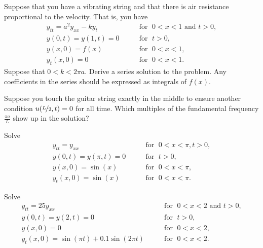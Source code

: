 \begin{exercise}[challenging]
Suppose that you have a vibrating string and that
there is air resistance proportional to the velocity.  That is, you have
\begin{equation*}
\begin{array}{ll}
y_{tt} = a^2 y_{xx} - k y_t  & \qquad \text{for } \; 0 < x < 1 \text{ and } t > 0,  \\
y(0,t) = y(1,t) = 0 & \qquad \text{for } \; t > 0, \\
y(x,0) = f(x) & \qquad \text{for } \; 0 < x < 1 , \\
y_t(x,0) = 0 & \qquad \text{for } \; 0 < x < 1 .
\end{array}
\end{equation*}
Suppose that $0 < k < 2 \pi a$.
Derive a series solution to the problem.  Any coefficients in the series
should be expressed as integrals of $f(x)$.
\end{exercise}

\begin{exercise}
Suppose you touch the guitar string exactly in the middle to
ensure another condition $u(\nicefrac{L}{2},t) = 0$ for all time.
Which multiples of the fundamental frequency $\frac{\pi a}{L}$
show up in the solution?
\end{exercise}

\setcounter{exercise}{100}

\begin{exercise}
Solve
\begin{equation*}
\begin{array}{ll}
y_{tt} = y_{xx}  & \qquad \text{for } \; 0 < x < \pi, t > 0,  \\
y(0,t) = y(\pi,t) = 0 & \qquad \text{for } \; t > 0,  \\
y(x,0) = \sin(x) & \qquad \text{for } \; 0 < x < \pi , \\
y_t(x,0) = \sin(x) & \qquad \text{for } \; 0 < x < \pi .
\end{array}
\end{equation*}
\end{exercise}

\begin{exercise}
Solve
\begin{equation*}
\begin{array}{ll}
y_{tt} = 25 y_{xx} & \qquad \text{for } \; 0 < x < 2 \text{ and } t > 0,  \\
y(0,t) = y(2,t) = 0 & \qquad \text{for } \; t > 0, \\
y(x,0) = 0 & \qquad \text{for } \; 0 < x < 2 , \\
y_t(x,0) = \sin(\pi t) + 0.1 \sin(2\pi t) & \qquad \text{for } \; 0 < x < 2 .
\end{array}
\end{equation*}
\end{exercise}

